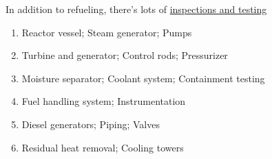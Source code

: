 \documentclass[aspectratio=1610,pdftex,dvipsnames,compress,xcolor={dvipsnames}]{beamer}
\begin{document}
\begin{frame}{In addition to refueling, there's lots of \href{http://www-pub.iaea.org/MTCD/Publications/PDF/TRS449_web.pdf}{inspections and testing}}
    \begin{enumerate}[series=outerlist,topsep=0pt,itemsep=15pt,leftmargin=*,label=(\arabic*)]
        \item[]Reactor vessel; Steam generator; Pumps  
        \item[]Turbine and generator; Control rods; Pressurizer
        \item[]Moisture separator; Coolant system; Containment testing
        \item[]Fuel handling system; Instrumentation
        \item[]Diesel generators; Piping; Valves
        \item[]Residual heat removal; Cooling towers
    \end{enumerate}
\end{frame}


%
%
%
%
%
%
%


%
%
%
%
%
%
\end{document}
